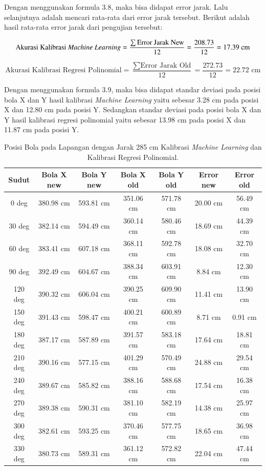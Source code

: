 Dengan menggunakan formula 3.8, maka bisa didapat error jarak. Lalu selanjutnya adalah mencari rata-rata dari error jarak tersebut. Berikut adalah hasil rata-rata error jarak dari pengujian tersebut:

\begin{equation}
  \text{Akurasi Kalibrasi \emph{Machine Learning}} = \frac{\sum \text{Error Jarak New}}{12} = \frac{208.73}{12} = 17.39 \text{ cm}
\end{equation}

\begin{equation}
  \text{Akurasi Kalibrasi Regresi Polinomial} = \frac{\sum \text{Error Jarak Old}}{12} = \frac{272.73}{12} = 22.72 \text{ cm}
\end{equation}

Dengan menggunakan formula 3.9, maka bisa didapat standar deviasi pada posisi bola X dan Y hasil kalibrasi \emph{Machine Learning} yaitu sebesar 3.28 cm pada posisi X dan 12.80 cm pada posisi Y. Sedangkan standar deviasi pada posisi bola X dan Y hasil kalibrasi regresi polinomial yaitu sebesar 13.98 cm pada posisi X dan 11.87 cm pada posisi Y.

\begin{longtable}{|c|c|c|c|c|c|c|}
  \caption{Posisi Bola pada Lapangan dengan Jarak 285 cm Kalibrasi \emph{Machine Learning} dan Kalibrasi Regresi Polinomial.}
  \label{tb:posisibolalapangan285}                                   \\
  \hline
  \rowcolor[HTML]{C0C0C0}
  \textbf{Sudut} & \textbf{Bola X new} & \textbf{Bola Y new} & \textbf{Bola X old} & \textbf{Bola Y old} & \textbf{Error new} & \textbf{Error old} \\
  \hline
  0 deg   & 380.98 cm & 593.81 cm & 351.06 cm & 571.78 cm & 20.00 cm & 56.49 cm \\
  30 deg  & 382.14 cm & 594.49 cm & 360.14 cm & 580.46 cm & 18.69 cm & 44.39 cm \\
  60 deg  & 383.41 cm & 607.18 cm & 368.11 cm & 592.78 cm & 18.08 cm & 32.70 cm \\
  90 deg  & 392.49 cm & 604.67 cm & 388.34 cm & 603.91 cm & 8.84 cm & 12.30 cm \\
  120 deg & 390.32 cm & 606.04 cm & 390.25 cm & 609.90 cm & 11.41 cm & 13.90 cm \\
  150 deg & 391.43 cm & 598.47 cm & 400.21 cm & 600.89 cm & 8.71 cm & 0.91 cm \\
  180 deg & 387.17 cm & 587.89 cm & 391.57 cm & 583.18 cm & 17.64 cm & 18.81 cm \\
  210 deg & 390.16 cm & 577.15 cm & 401.29 cm & 570.49 cm & 24.88 cm & 29.54 cm \\
  240 deg & 389.67 cm & 585.82 cm & 388.16 cm & 588.68 cm & 17.54 cm & 16.38 cm \\
  270 deg & 389.38 cm & 590.31 cm & 381.10 cm & 582.19 cm & 14.38 cm & 25.97 cm \\
  300 deg & 382.61 cm & 593.25 cm & 370.46 cm & 577.75 cm & 18.65 cm & 36.98 cm \\
  330 deg & 380.73 cm & 589.31 cm & 361.12 cm & 572.82 cm & 22.04 cm & 47.44 cm \\
  \hline
\end{longtable}

